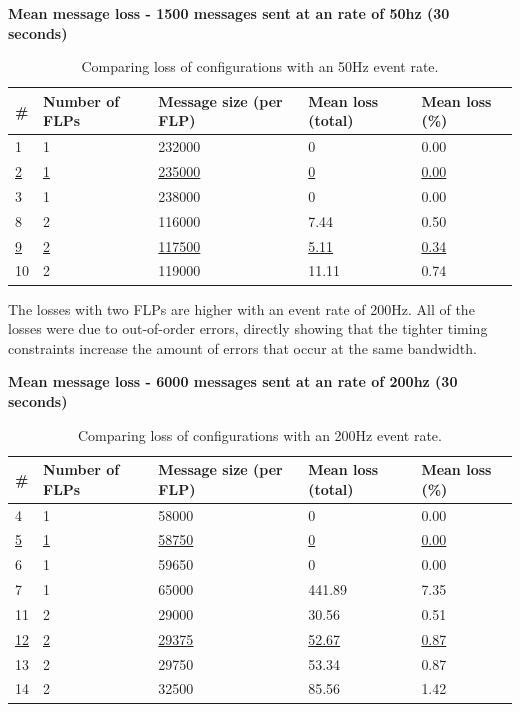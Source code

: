 \documentclass[]{article}
\begin{document}
\begin{table}[H]
	\textbf{Mean message loss - 1500 messages sent at an rate of 50hz (30 seconds)}	
	\begin{center}
		\begin{tabularx}{\textwidth}{ | X | X | X | X | X | }
			\hline
			\textbf{\#} & \textbf{Number of FLPs} & \textbf{Message size (per FLP)} & \textbf{Mean loss (total)} & \textbf{Mean loss (\%)} \\ \hline
			
			1 & 1 & 232000 & 0 & 0.00 \\ \hline
			\underline{2} & \underline{1} & \underline{235000} & \underline{0} & \underline{0.00} \\ \hline
			3 & 1 & 238000 & 0 & 0.00 \\ \hline
			8 & 2 & 116000 & 7.44 & 0.50 \\ \hline
			\underline{9} & \underline{2} & \underline{117500} & \underline{5.11} & \underline{0.34}\\ \hline
			10 & 2 & 119000 & 11.11 & 0.74 \\ \hline
		\end{tabularx}
		\caption{Comparing loss of configurations with an 50Hz event rate.}
		\label{tab:resultsroundone}
	\end{center}
\end{table}

The losses with two FLPs are higher with an event rate of 200Hz. All of the losses were due to out-of-order errors, directly showing that the tighter timing constraints increase the amount of errors that occur at the same bandwidth.

\begin{table}[H]
	\textbf{Mean message loss - 6000 messages sent at an rate of 200hz (30 seconds)}	
	\begin{center}
		\begin{tabularx}{\textwidth}{ | X | X | X | X | X | }
			\hline
			\textbf{\#} & \textbf{Number of FLPs} & \textbf{Message size (per FLP)} & \textbf{Mean loss (total)} & \textbf{Mean loss (\%)} \\ \hline
			
			4 & 1 & 58000 & 0 & 0.00 \\ \hline
			\underline{5} & \underline{1} & \underline{58750} & \underline{0} & \underline{0.00} \\ \hline
			6 & 1 & 59650 & 0 & 0.00 \\ \hline
			7 & 1 & 65000 & 441.89 & 7.35 \\ \hline
			11 & 2 & 29000 & 30.56 & 0.51 \\ \hline
			\underline{12} & \underline{2} & \underline{29375} & \underline{52.67} & \underline{0.87}\\ \hline
			13 & 2 & 29750 & 53.34 & 0.87 \\ \hline
			14 & 2 & 32500 & 85.56 & 1.42 \\ \hline
		\end{tabularx}
		\caption{Comparing loss of configurations with an 200Hz event rate.}
		\label{tab:resultsroundtwo}
	\end{center}
\end{table}
\end{document}
